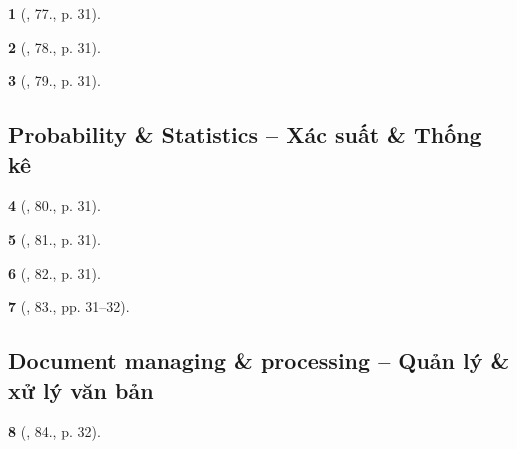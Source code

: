 \documentclass{article}
\newtheorem{baitoan}{}
\begin{document}
\begin{baitoan}[\cite{Doanh_Tuan_Pascal}, 77., p. 31]
	
\end{baitoan}

\begin{baitoan}[\cite{Doanh_Tuan_Pascal}, 78., p. 31]
	
\end{baitoan}

\begin{baitoan}[\cite{Doanh_Tuan_Pascal}, 79., p. 31]
	
\end{baitoan}


\subsection{Probability \& Statistics -- Xác suất \& Thống kê}

\begin{baitoan}[\cite{Doanh_Tuan_Pascal}, 80., p. 31]
	
\end{baitoan}

\begin{baitoan}[\cite{Doanh_Tuan_Pascal}, 81., p. 31]
	
\end{baitoan}

\begin{baitoan}[\cite{Doanh_Tuan_Pascal}, 82., p. 31]
	
\end{baitoan}

\begin{baitoan}[\cite{Doanh_Tuan_Pascal}, 83., pp. 31--32]
	
\end{baitoan}


\subsection{Document managing \& processing -- Quản lý \& xử lý văn bản}

\begin{baitoan}[\cite{Doanh_Tuan_Pascal}, 84., p. 32]
	
\end{baitoan}
\end{document}
